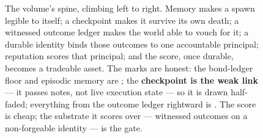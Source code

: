 \begin{figure}[H]
{%
}
\caption{The volume's spine, climbing left to right. Memory makes a spawn legible
to itself; a checkpoint makes it survive its own death; a witnessed outcome ledger
makes the world able to vouch for it; a durable identity binds those outcomes to
one accountable principal; reputation scores that principal; and the score, once
durable, becomes a tradeable asset. The marks are honest: the bond-ledger floor and
episodic memory are \built{}; the \textbf{checkpoint is the weak link} --- it passes
notes, not live execution state --- so it is drawn half-faded; everything from the
outcome ledger rightward is \designed{}. The score is cheap; the substrate it scores
over --- witnessed outcomes on a non-forgeable identity --- is the gate.}
\label{fig:he-spine-pipeline}
\end{figure}
